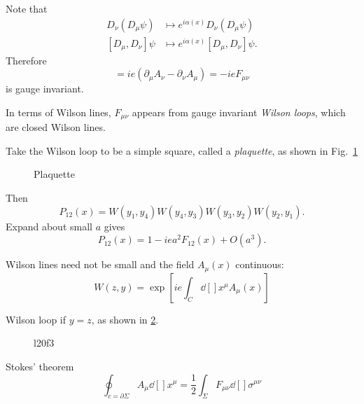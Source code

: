 Note that 
\begin{align}
  D_{\nu} (D_{\mu} \psi) &\mapsto e^{i \alpha(x)} D_{\nu}(D_{\mu} \psi) \\
  [D_{\mu}, D_{\nu}] \psi &\mapsto e^{i \alpha(x)} [D_{\mu}, D_{\nu}] \psi.
\end{align}
Therefore
\begin{equation}
  [D_{\mu}, D_{\nu}] = i e (\partial_{\mu} A_{\nu} - \partial_{\nu} A_{\mu}) = -i e F_{\mu\nu}
\end{equation}
is gauge invariant.

In terms of Wilson lines, $F_{\mu\nu}$ appears from gauge invariant \emph{Wilson loops}, which are closed Wilson lines.
\begin{example}[plaquette]
  Take the Wilson loop to be a simple square, called a \emph{plaquette}, as shown in Fig.~\ref{fig:plaquette}
  \begin{figure}[ht]
    \centering
    \caption{Plaquette}
    \label{fig:plaquette}
  \end{figure}
  Then
  \begin{equation}
    P_{12} (x) = W(y_1, y_4) W(y_4, y_3) W(y_3, y_2) W(y_2, y_1).
  \end{equation}
  Expand about small $a$ gives
  \begin{equation}
    P_{12}(x) = 1 - i e a^2 F_{12}(x) + O(a^3).
  \end{equation}
\end{example}
Wilson lines need not be small and the field $A_{\mu}(x)$ continuous:
\begin{equation}
  W(z, y) = \exp[i e \int_C \dd[]{x^{\mu}} A_{\mu}(x)]
\end{equation}

Wilson loop if $y = z$, as shown in \ref{fig:l20f3}.
\begin{figure}[ht]
  \centering
  \caption{l20f3}
  \label{fig:l20f3}
\end{figure}
Stokes' theorem
\begin{equation}
  \oint_{c = \partial \Sigma} A_{\mu} \dd[]{x^{\mu}} = \frac{1}{2} \int_\Sigma F_{\mu\nu} \dd[]{\sigma^{\mu\nu}}
\end{equation}
